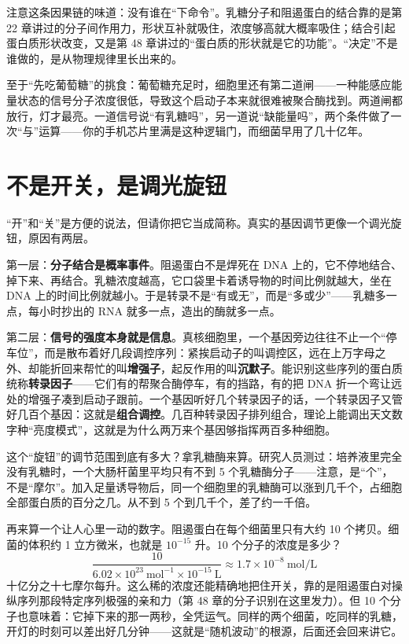 注意这条因果链的味道：没有谁在“下命令”。乳糖分子和阻遏蛋白的结合靠的是第 22 章讲过的分子间作用力，形状互补就吸住，浓度够高就大概率吸住；结合引起蛋白质形状改变，又是第 48 章讲过的“蛋白质的形状就是它的功能”。“决定”不是谁做的，是从物理规律里长出来的。

至于“先吃葡萄糖”的挑食：葡萄糖充足时，细胞里还有第二道闸——一种能感应能量状态的信号分子浓度很低，导致这个启动子本来就很难被聚合酶找到。两道闸都放行，灯才最亮。一道信号说“有乳糖吗”，另一道说“缺能量吗”，两个条件做了一次“与”运算——你的手机芯片里满是这种逻辑门，而细菌早用了几十亿年。

\section{不是开关，是调光旋钮}

“开”和“关”是方便的说法，但请你把它当成简称。真实的基因调节更像一个调光旋钮，原因有两层。

第一层：\textbf{分子结合是概率事件}。阻遏蛋白不是焊死在 DNA 上的，它不停地结合、掉下来、再结合。乳糖浓度越高，它口袋里卡着诱导物的时间比例就越大，坐在 DNA 上的时间比例就越小。于是转录不是“有或无”，而是“多或少”——乳糖多一点，每小时抄出的 RNA 就多一点，造出的酶就多一点。

第二层：\textbf{信号的强度本身就是信息}。真核细胞里，一个基因旁边往往不止一个“停车位”，而是散布着好几段调控序列：紧挨启动子的叫调控区，远在上万字母之外、却能折回来帮忙的叫\textbf{增强子}，起反作用的叫\textbf{沉默子}。能识别这些序列的蛋白质统称\textbf{转录因子}——它们有的帮聚合酶停车，有的挡路，有的把 DNA 折一个弯让远处的增强子凑到启动子跟前。一个基因听好几个转录因子的话，一个转录因子又管好几百个基因：这就是\textbf{组合调控}。几百种转录因子排列组合，理论上能调出天文数字种“亮度模式”，这就是为什么两万来个基因够指挥两百多种细胞。

\begin{qiaoliang}
这个“旋钮”的调节范围到底有多大？拿乳糖酶来算。研究人员测过：培养液里完全没有乳糖时，一个大肠杆菌里平均只有不到 5 个乳糖酶分子——注意，是“个”，不是“摩尔”。加入足量诱导物后，同一个细胞里的乳糖酶可以涨到几千个，占细胞全部蛋白质的百分之几。从不到 5 个到几千个，差了约一千倍。

再来算一个让人心里一动的数字。阻遏蛋白在每个细菌里只有大约 10 个拷贝。细菌的体积约 1 立方微米，也就是 $10^{-15}$ 升。10 个分子的浓度是多少？
\[
\frac{10}{6.02\times 10^{23}\ \mathrm{mol^{-1}}\times 10^{-15}\ \mathrm{L}}\approx 1.7\times 10^{-8}\ \mathrm{mol/L}
\]
十亿分之十七摩尔每升。这么稀的浓度还能精确地把住开关，靠的是阻遏蛋白对操纵序列那段特定序列极强的亲和力（第 48 章的分子识别在这里发力）。但 10 个分子也意味着：它掉下来的那一两秒，全凭运气。同样的两个细菌，吃同样的乳糖，开灯的时刻可以差出好几分钟——这就是“随机波动”的根源，后面还会回来讲它。
\end{qiaoliang}


